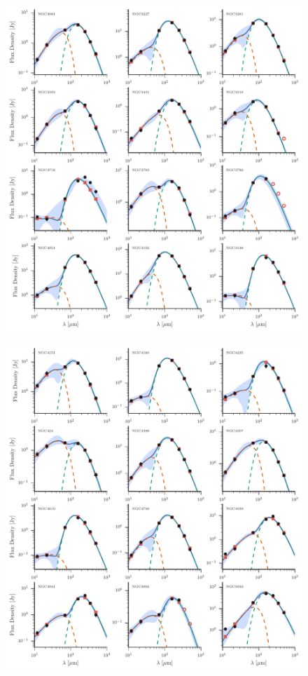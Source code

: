 \begin{figure}
\centering
\includegraphics[width=\textwidth]{figures/sedfig20}
\caption{}
\end{figure}

\begin{figure}
\centering
\includegraphics[width=\textwidth]{figures/sedfig21}
\caption{}
\end{figure}

